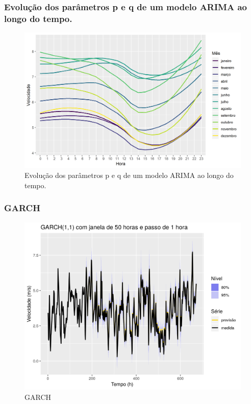 \documentclass{beamer}
\begin{document}
\begin{frame}
	\frametitle{Evolução dos parâmetros p e q de um modelo ARIMA ao longo do tempo.}
	\begin{figure}
		\centering
		\includegraphics[width=\textwidth]{diurnal}
		\caption{Evolução dos parâmetros p e q de um modelo ARIMA ao longo do tempo.}
	\end{figure}
\end{frame}

\begin{frame}
	\frametitle{GARCH}
	\begin{figure}
		\centering
		\includegraphics[width=\textwidth]{garch_first}
		\caption{GARCH}
	\end{figure}
\end{frame}
\end{document}
